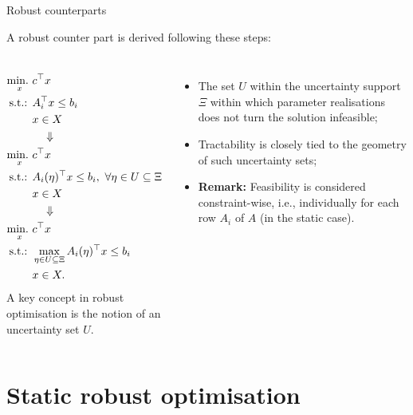 \begin{frame}{Robust counterparts}

A \alert{robust counter part} is derived following these steps:
%
\begin{columns}
	\vspace{-12pt}
	\begin{align*}
		\mathop{\text{min.} \ }_x & c^\top x \\
		\text{s.t.: } & A_i^\top x \le b_i \\
		& x \in X\\
		&\quad \Downarrow \\
		\mathop{\text{min.} \ }_x & c^\top x \\
		\text{s.t.: } & A_i(\eta)^\top x \le b_i, \ \forall \eta \in U \subseteq \Xi \\
		& x \in X \\
		&\quad \Downarrow \\
		\mathop{\text{min.} \ }_x & c^\top x \\
		\text{s.t.: } & \max_{\eta \in U \subseteq \Xi}A_i(\eta)^\top x \le b_i \\
			& x \in X.
	\end{align*}
	\pause
	A key concept in robust optimisation is the notion of an \alert{uncertainty set} $U$.
	\begin{itemize}
		\item The set $U$ within the uncertainty support $\Xi$ within which \alert{parameter realisations} does not turn the solution infeasible;
		\item Tractability is closely tied to the \alert{geometry} of such uncertainty sets;
		\item {\bf Remark:} Feasibility is considered \alert{constraint-wise}, i.e., individually for each row $A_i$ of $A$ (in the static case).
	\end{itemize}
\end{columns}
\end{frame}


\section{Static robust optimisation}


